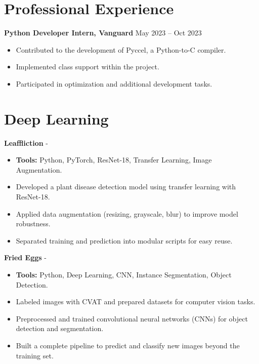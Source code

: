 \documentclass[a4paper,11pt]{article}%
\begin{document}
\section*{Professional Experience}%
\textbf{Python Developer Intern, Vanguard} \hfill May 2023 -- Oct 2023%
\begin{itemize}[leftmargin=*]%
\item Contributed to the development of Pyccel, a Python-to-C compiler.%
\item Implemented class support within the project.%
\item Participated in optimization and additional development tasks.%
\end{itemize}%
%
\section*{Deep Learning}%
%
\noindent \textbf{Leaffliction} - \href{https://github.com/sboof911/Leaffliction}{{}}%
\begin{itemize}[leftmargin=2em,parsep=0pt,topsep=1em]%
\item[] \textbf{Tools:} Python, PyTorch, ResNet-18, Transfer Learning, Image Augmentation.%
\item Developed a plant disease detection model using transfer learning with ResNet-18.%
\item Applied data augmentation (resizing, grayscale, blur) to improve model robustness.%
\item Separated training and prediction into modular scripts for easy reuse.%
\end{itemize}%
%
\noindent \textbf{Fried Eggs} - \href{https://github.com/sboof911/Fried-eggs}{{}}%
\begin{itemize}[leftmargin=2em,parsep=0pt,topsep=1em]%
\item[] \textbf{Tools:} Python, Deep Learning, CNN, Instance Segmentation, Object Detection.%
\item Labeled images with CVAT and prepared datasets for computer vision tasks.%
\item Preprocessed and trained convolutional neural networks (CNNs) for object detection and segmentation.%
\item Built a complete pipeline to predict and classify new images beyond the training set.%
\end{itemize}%
\end{document}
